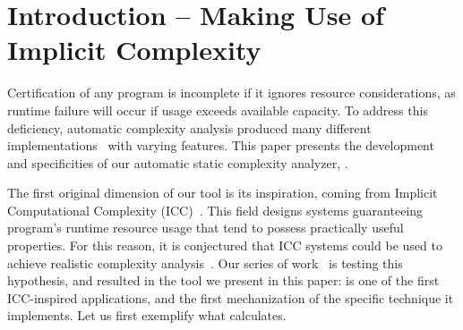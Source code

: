 \documentclass[runningheads]{llncs}
\begin{document}
\section{Introduction -- Making Use of Implicit Complexity}
\label{sec:intro}

Certification of any program is incomplete if it ignores resource considerations, as runtime failure will occur if usage exceeds available capacity.
To address this deficiency, automatic complexity analysis produced many different implementations~\cite{Carbonneaux2015,giesl2017,hainry2021,Hoffmann2012c} with varying features.
This paper presents the development and specificities of our automatic static complexity analyzer, \pymwp.

The first original dimension of our tool is its inspiration, coming from Implicit Computational Complexity (ICC)~\cite{DalLago2012a}.
This field designs systems guaranteeing program's runtime resource usage that tend to possess practically useful properties.
For this reason,
it is conjectured that ICC systems could be used to achieve realistic complexity analysis~\cite[p.~16]{Moyen2017c}.
Our series of work~\cite{Aubert2022b,Aubert2022g} is testing this hypothesis, and resulted in the tool we present in this paper: 
 \pymwp is one of the first ICC-inspired applications, and the first mechanization of the specific technique it implements. %
Let us first exemplify what \pymwp calculates.
\end{document}
